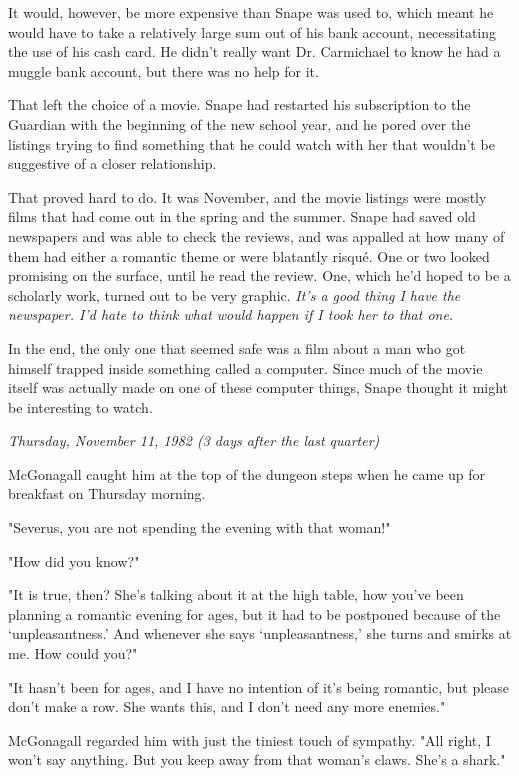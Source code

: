 \documentclass[a4paper,11pt]{article}
\begin{document}
It would, however, be more expensive than Snape was used to, which meant he would have to take a relatively large sum out of his bank account, necessitating the use of his cash card. He didn't really want Dr. Carmichael to know he had a muggle bank account, but there was no help for it.

That left the choice of a movie. Snape had restarted his subscription to the Guardian with the beginning of the new school year, and he pored over the listings trying to find something that he could watch with her that wouldn't be suggestive of a closer relationship.

That proved hard to do. It was November, and the movie listings were mostly films that had come out in the spring and the summer. Snape had saved old newspapers and was able to check the reviews, and was appalled at how many of them had either a romantic theme or were blatantly risqué. One or two looked promising on the surface, until he read the review. One, which he'd hoped to be a scholarly work, turned out to be very graphic. \emph{It's a good thing I have the newspaper. I'd hate to think what would happen if I took her to that one.}

In the end, the only one that seemed safe was a film about a man who got himself trapped inside something called a computer. Since much of the movie itself was actually made on one of these computer things, Snape thought it might be interesting to watch.

\emph{Thursday, November 11, 1982 (3 days after the last quarter)}

McGonagall caught him at the top of the dungeon steps when he came up for breakfast on Thursday morning.

"Severus, you are not spending the evening with that woman!"

"How did you know?"

"It is true, then? She's talking about it at the high table, how you've been planning a romantic evening for ages, but it had to be postponed because of the `unpleasantness.' And whenever she says `unpleasantness,' she turns and smirks at me. How could you?"

"It hasn't been for ages, and I have no intention of it's being romantic, but please don't make a row. She wants this, and I don't need any more enemies."

McGonagall regarded him with just the tiniest touch of sympathy. "All right, I won't say anything. But you keep away from that woman's claws. She's a shark."
\end{document}
